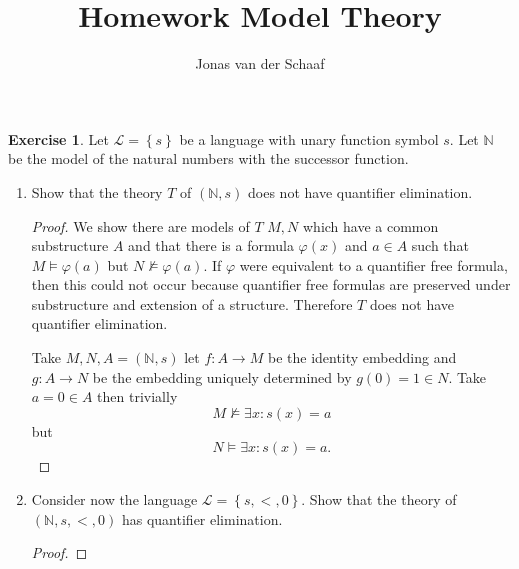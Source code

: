 \documentclass{article}
\title{Homework Model Theory}
\author{Jonas van der Schaaf}
\date{}
\newcommand{\N}{\mathbb{N}}
\newcommand{\set}[1]{\left\{#1\right\}}
\newcommand{\lang}{\mathscr{L}}
\theoremstyle{definition}
\newtheorem{question}{Exercise}
\begin{document}
\maketitle

\begin{question}
    Let \(\lang=\set{s}\) be a language with unary function symbol \(s\). Let
    \(\N\) be the model of the natural numbers with the successor function.

    \begin{enumerate}[(1)]
        \item Show that the theory \(T\) of \((\N,s)\) does not have quantifier
              elimination.

              \begin{proof}
                  We show there are models of \(T\) \(M,N\) which have a common
                  substructure \(A\) and that there is a formula \(\varphi(x)\)
                  and \(a\in A\) such that \(M\models\varphi(a)\) but
                  \(N\nvDash\varphi(a)\). If \(\varphi\) were equivalent to a
                  quantifier free formula, then this could not occur because
                  quantifier free formulas are preserved under substructure and
                  extension of a structure. Therefore \(T\) does not have
                  quantifier elimination.

                  Take \(M,N,A=(\N,s)\) let \(f:A\to M\) be the identity
                  embedding and \(g:A\to N\) be the embedding uniquely
                  determined by \(g(0)=1\in N\). Take \(a=0\in A\) then
                  trivially
                  \[
                      M\nvDash\exists x:s(x)=a
                  \]
                  but
                  \[
                      N\models\exists x:s(x)=a.
                  \]
              \end{proof}

        \item Consider now the language \(\lang=\set{s,<,0}\). Show that the
              theory of \((\N,s,<,0)\) has quantifier elimination.

              \begin{proof}

              \end{proof}
    \end{enumerate}
\end{question}
\end{document}
